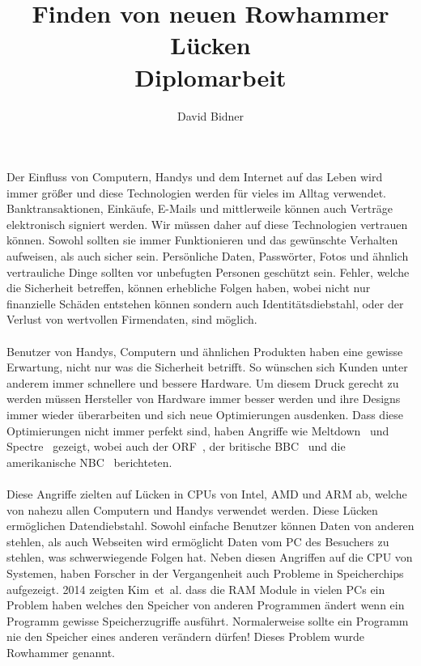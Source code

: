 \documentclass[a4paper]{article}
\title{Finden von neuen Rowhammer Lücken \\ \vspace{+2ex}\small{Diplomarbeit}}
\author{David Bidner}
\date{\vspace{-5ex}}
\newcommand{\etal}{et~al. }
\begin{document}
\maketitle

Der Einfluss von Computern, Handys und dem Internet auf das Leben wird immer
größer und diese Technologien werden für vieles im Alltag verwendet.
Banktransaktionen, Einkäufe, E-Mails und mittlerweile können auch Verträge
elektronisch signiert werden. Wir müssen daher auf diese Technologien vertrauen
können. Sowohl sollten sie immer Funktionieren und das gewünschte Verhalten
aufweisen, als auch sicher sein. Persönliche Daten, Passwörter, Fotos und
ähnlich vertrauliche Dinge sollten vor unbefugten Personen geschützt sein.
Fehler, welche die Sicherheit betreffen, können erhebliche Folgen haben, wobei
nicht nur finanzielle Schäden entstehen können sondern auch Identitätsdiebstahl,
oder der Verlust von wertvollen Firmendaten, sind möglich.

\paragraph{}

Benutzer von Handys, Computern und ähnlichen Produkten haben eine gewisse
Erwartung, nicht nur was die Sicherheit betrifft. So wünschen sich Kunden unter
anderem immer schnellere und bessere Hardware. Um diesem Druck gerecht zu werden
müssen Hersteller von Hardware immer besser werden und ihre Designs immer wieder
überarbeiten und sich neue Optimierungen ausdenken. Dass diese Optimierungen
nicht immer perfekt sind, haben Angriffe wie Meltdown~\cite{meltdown}
und Spectre~\cite{spectre} gezeigt, wobei auch der ORF~\cite{orfmeltdown}, der 
britische BBC~\cite{bbcmeltdown} und die amerikanische NBC~\cite{nbcmeltdown} 
berichteten.

\paragraph{}

Diese Angriffe zielten auf Lücken in CPUs von Intel, AMD und ARM ab, welche
von nahezu allen Computern und Handys verwendet werden. Diese Lücken 
ermöglichen Datendiebstahl. Sowohl einfache Benutzer können Daten von anderen
stehlen, als auch Webseiten wird ermöglicht Daten vom PC des Besuchers zu
stehlen, was schwerwiegende Folgen hat. Neben diesen Angriffen auf die CPU
von Systemen, haben Forscher in der Vergangenheit auch Probleme in 
Speicherchips aufgezeigt. 2014 zeigten Kim~\etal\cite{rowhammergeneral} dass 
die RAM Module in vielen PCs ein Problem haben welches den Speicher von anderen
Programmen ändert wenn ein Programm gewisse Speicherzugriffe ausführt.
Normalerweise sollte ein Programm nie den Speicher eines anderen verändern 
dürfen! Dieses Problem wurde Rowhammer genannt.
\end{document}
